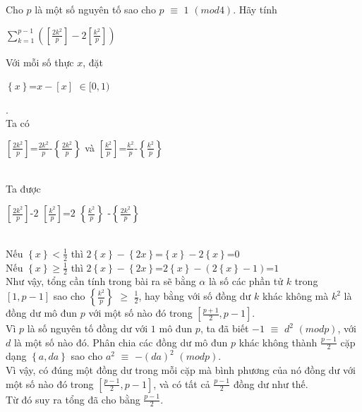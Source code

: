 \begin{baitap}
Cho $p$ là một số nguyên tố sao cho $p$ $\equiv$ $1$ $(mod4)$. Hãy tính\\
\centerline {         $\sum_{k=1}^{p-1}\left(\left[\frac{2k^2}{p}\right]-2\left[\frac{k^2}{p}\right]\right)$                }

\begin{loigiai2}
Với mỗi số thực $x$, đặt\\
\centerline {$\left\{x\right\}$=$x-\left[x\right]$ $\in [0,1)$}.\\
Ta có\\
 \centerline{$\left[\frac{2k^2}{p}\right]$=$\frac{2k^2}{p}$-$\left\{\frac{2k^2}{p}\right\}$ và 
$\left[\frac{k^2}{p}\right]$=$\frac{k^2}{p}$-$\left\{\frac{k^2}{p}\right\}$}\\
Ta được\\
\centerline {$\left[\frac{2k^2}{p}\right]$-$2$ $\left[\frac{k^2}{p}\right]$=$2$ $\left\{\frac{k^2}{p}\right\}$
-$\left\{\frac{2k^2}{p}\right\}$}\\
Nếu ${\left\{x\right\}<\frac{1}{2}}$    thì    ${2\left\{x\right\}-\left\{2x\right\}}$=${\left\{x\right\}-2\left\{x\right\}}$=$0$\\
Nếu $\left\{x\right\}\geq\frac{1}{2}$     thì   ${2\left\{x\right\}-\left\{2x\right\}}$=$2{\left\{x\right\}-(2\left\{x\right\}-1)}$=$1$\\
Như vậy, tổng cần tính trong bài ra sẽ bằng $\alpha$ là số các phần tử $k$ trong $\left[1, p-1\right]$ sao cho 
$\left\{\frac{k^2}{p}\right\}$ $\geq$ $\frac{1}{2}$, hay bằng với số đồng dư $k$ khác không mà $k^2$ là đồng dư mô 
đun $p$ với một số nào đó trong $\left[\frac{p+1}{2}, p-1\right]$.\\
Vì $p$ là số nguyên tố đồng dư với $1$ mô đun $p$, ta đã biết $-1$ $\equiv$ $d^2$ $(mod p)$, với $d$ là một số nào đó. 
Phân chia các đồng dư mô đun $p$ khác không thành $\frac{p-1}{2}$ cặp dạng $\left\{a, da\right\}$ sao cho
 $a^2$ $\equiv$ $-(da)^2$ $(modp)$.\\
Vì vậy, có đúng một đồng dư trong mỗi cặp mà bình phương của nó đồng dư với một số nào đó trong 
$\left[\frac{p-1}{2}, p-1\right]$, và có tất cả $\frac{p-1}{2}$ đồng dư như thế.\\
Từ đó suy ra tổng đã cho bằng $\frac{p-1}{2}$.
\end{loigiai2}
\end{baitap}

